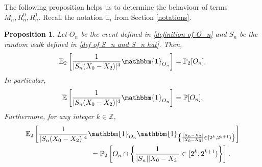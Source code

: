 \documentclass[9pt,a4paper,reqno]{amsart}
\theoremstyle{mine}
\newtheorem{prop}[thm]{Proposition}
\theoremstyle{definition}
\theoremstyle{remark}
\newcommand{\mb}{\mathbb}
\begin{document}


The following proposition helps us to determine the behaviour of terms $M_n, R_n^0, R_n^1$. Recall the notation $\mb{E}_i$ from Section \ref{notations}.

\begin{prop}\label{main term being probability}
    Let $O_n$ be the event defined in \eqref{definition of O_n} and $S_n$ be the random walk defined in \eqref{def of S_n and S_n hat}. Then, 
    \begin{align}\label{E2-bound}
\mathbb{E}_2\left[ \frac{1}{|S_n(X_0-X_2)|^4} \mathbbm{1}_{O_n} \right]= \mathbb{P}_2[O_n]. 
        \end{align}
    In particular, 
    \begin{align}
\mathbb{E}\left[ \frac{1}{|S_n(X_0-X_2)|^4} \mathbbm{1}_{O_n} \right]= \mathbb{P}[O_n]. 
        \end{align}
Furthermore, for any integer $k\in \mb{Z}$, 
\begin{align}\label{2^k-bound}
\mathbb{E}_2&\left[ \frac{1}{|S_n(X_0-X_2)|^4} \mathbbm{1}_{O_n} \mathbbm{1}_{\left \{ \frac{|X_0-X_2|}{|X_0-X_3|} \in [2^k, 2^{k+1})\right\}}\right] \nonumber
           \\ &\qquad \qquad\qquad\qquad = \mathbb{P}_2\left[O_n \cap \left\{ \frac{1}{|S_n||X_0-X_3|}\in [2^k, 2^{k+1})\right\}\right].
            \end{align}
\end{prop}
\end{document}
